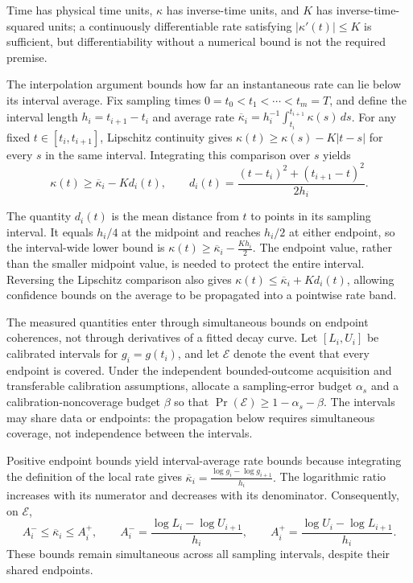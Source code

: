 \documentclass[11pt]{article}
\begin{document}
Time has physical time units, $\kappa$ has inverse-time units, and $K$ has inverse-time-squared units; a continuously differentiable rate satisfying $|\kappa'(t)|\leq K$ is sufficient, but differentiability without a numerical bound is not the required premise.

The interpolation argument bounds how far an instantaneous rate can lie below its interval average. Fix sampling times $0=t_0<t_1<\cdots<t_m=T$, and define the interval length $h_i=t_{i+1}-t_i$ and average rate $\overline\kappa_i=h_i^{-1}\int_{t_i}^{t_{i+1}}\kappa(s)\,ds$. For any fixed $t\in[t_i,t_{i+1}]$, Lipschitz continuity gives $\kappa(t)\geq\kappa(s)-K|t-s|$ for every $s$ in the same interval. Integrating this comparison over $s$ yields
\[\kappa(t)\geq\overline\kappa_i-Kd_i(t),\qquad d_i(t)=\frac{(t-t_i)^2+(t_{i+1}-t)^2}{2h_i}.\]

The quantity $d_i(t)$ is the mean distance from $t$ to points in its sampling interval. It equals $h_i/4$ at the midpoint and reaches $h_i/2$ at either endpoint, so the interval-wide lower bound is
$\kappa(t)\geq\overline\kappa_i-\frac{Kh_i}{2}.$
The endpoint value, rather than the smaller midpoint value, is needed to protect the entire interval. Reversing the Lipschitz comparison also gives $\kappa(t)\leq\overline\kappa_i+Kd_i(t)$, allowing confidence bounds on the average to be propagated into a pointwise rate band.

The measured quantities enter through simultaneous bounds on endpoint coherences, not through derivatives of a fitted decay curve. Let $[L_i,U_i]$ be calibrated intervals for $g_i=g(t_i)$, and let $\mathcal E$ denote the event that every endpoint is covered. Under the independent bounded-outcome acquisition and transferable calibration assumptions, allocate a sampling-error budget $\alpha_s$ and a calibration-noncoverage budget $\beta$ so that $\Pr(\mathcal E)\geq1-\alpha_s-\beta$. The intervals may share data or endpoints: the propagation below requires simultaneous coverage, not independence between the intervals.

Positive endpoint bounds yield interval-average rate bounds because integrating the definition of the local rate gives
$\overline\kappa_i=\frac{\log g_i-\log g_{i+1}}{h_i}.$
The logarithmic ratio increases with its numerator and decreases with its denominator. Consequently, on $\mathcal E$,
\[A_i^-\leq\overline\kappa_i\leq A_i^+,\qquad A_i^-=\frac{\log L_i-\log U_{i+1}}{h_i},\qquad A_i^+=\frac{\log U_i-\log L_{i+1}}{h_i}.\]
These bounds remain simultaneous across all sampling intervals, despite their shared endpoints.
\end{document}
